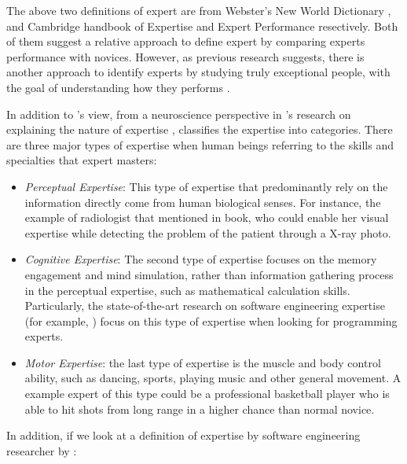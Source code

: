 The above two definitions of expert are from Webster's New World Dictionary \cite{guralnik1983webster}, and Cambridge handbook of Expertise and Expert Performance \cite{ericsson2006cambridge} resectively. Both of them suggest a relative approach to define expert by comparing experts performance with novices. However, as previous research suggests, there is another approach to identify experts by studying truly exceptional people, with the goal of understanding how they performs \cite{chi2006two}.

In addition to \citeauthor{ericsson2006cambridge}'s view, from a neuroscience perspective in \citeauthor{bilalić2017neuroscience}'s research on explaining the nature of expertise \cite{bilalić2017neuroscience}, \citeauthor{bilalić2017neuroscience} classifies the expertise into categories. There are three major types of expertise when human beings referring to the skills and specialties that expert masters:

\begin{itemize}
\item \textit{Perceptual Expertise}: This type of expertise that predominantly rely on the information directly come from human biological senses. For instance, the example of radiologist that \citeauthor{bilalić2017neuroscience} mentioned in book, who could enable her visual expertise while detecting the problem of the patient through a X-ray photo.
\item \textit{Cognitive Expertise}: The second type of expertise focuses on the memory engagement and mind simulation, rather than information gathering process in the perceptual expertise, such as mathematical calculation skills. Particularly, the state-of-the-art research on software engineering expertise (for example, \cite{Anvik2006who, mcdonald2000expertise, mockus2002expertise, fritz2010degree, yu2016reviewer, costa2016tipmerge}) focus on this type of expertise when looking for programming experts.
\item \textit{Motor Expertise}: the last type of expertise is the muscle and body control ability, such as dancing, sports, playing music and other general movement. A example expert of this type could be a professional basketball player who is able to hit shots from long range in a higher chance than normal novice.
\end{itemize}

In addition, if we look at a definition of expertise by software engineering researcher by \citeauthor{mockus2002expertise} \cite{mockus2002expertise}: 

